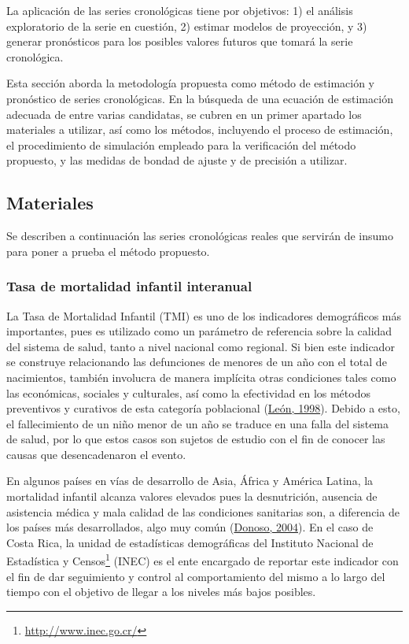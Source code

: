 \documentclass[
]{article}
\begin{document}
\label{chap:metodologia}

La aplicación de las series cronológicas tiene por objetivos: 1) el
análisis exploratorio de la serie en cuestión, 2) estimar modelos de
proyección, y 3) generar pronósticos para los posibles valores futuros
que tomará la serie cronológica.

Esta sección aborda la metodología propuesta como método de estimación y
pronóstico de series cronológicas. En la búsqueda de una ecuación de
estimación adecuada de entre varias candidatas, se cubren en un primer
apartado los materiales a utilizar, así como los métodos, incluyendo el
proceso de estimación, el procedimiento de simulación empleado para la
verificación del método propuesto, y las medidas de bondad de ajuste y
de precisión a utilizar.

\subsection{Materiales}

Se describen a continuación las series cronológicas reales que servirán
de insumo para poner a prueba el método propuesto.

\subsubsection{Tasa de mortalidad infantil interanual}

La Tasa de Mortalidad Infantil (TMI) es uno de los indicadores
demográficos más importantes, pues es utilizado como un parámetro de
referencia sobre la calidad del sistema de salud, tanto a nivel nacional
como regional. Si bien este indicador se construye relacionando las
defunciones de menores de un año con el total de nacimientos, también
involucra de manera implícita otras condiciones tales como las
económicas, sociales y culturales, así como la efectividad en los
métodos preventivos y curativos de esta categoría poblacional
(\protect\hyperlink{ref-leon}{León, 1998}). Debido a esto, el
fallecimiento de un niño menor de un año se traduce en una falla del
sistema de salud, por lo que estos casos son sujetos de estudio con el
fin de conocer las causas que desencadenaron el evento.

En algunos países en vías de desarrollo de Asia, África y América
Latina, la mortalidad infantil alcanza valores elevados pues la
desnutrición, ausencia de asistencia médica y mala calidad de las
condiciones sanitarias son, a diferencia de los países más
desarrollados, algo muy común (\protect\hyperlink{ref-donoso}{Donoso,
2004}). En el caso de Costa Rica, la unidad de estadísticas demográficas
del Instituto Nacional de Estadística y Censos\footnote{\url{http://www.inec.go.cr/}}
(INEC) es el ente encargado de reportar este indicador con el fin de dar
seguimiento y control al comportamiento del mismo a lo largo del tiempo
con el objetivo de llegar a los niveles más bajos posibles.
\end{document}
